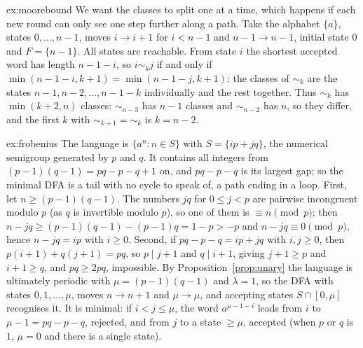 \begin{solution}{ex:moorebound}
\idea We want the classes to split one at a time, which happens if each new round can only see one step further along a path.
\writeup Take the alphabet $\{a\}$, states $0,\dots,n-1$, moves $i\to i+1$ for $i<n-1$ and $n-1\to n-1$, initial state $0$ and $F=\{n-1\}$. All states are reachable. From state $i$ the shortest accepted word has length $n-1-i$, so $i\sim_kj$ if and only if $\min(n-1-i,k+1)=\min(n-1-j,k+1)$: the classes of $\sim_k$ are the states $n-1,n-2,\dots,n-1-k$ individually and the rest together. Thus $\sim_k$ has $\min(k+2,n)$ classes: $\sim_{n-3}$ has $n-1$ classes and $\sim_{n-2}$ has $n$, so they differ, and the first $k$ with $\sim_{k+1}=\sim_k$ is $k=n-2$.
\end{solution}

\begin{solution}{ex:frobenius}
\idea The language is $\{a^n:n\in S\}$ with $S=\{ip+jq\}$, the numerical semigroup generated by $p$ and $q$. It contains all integers from $(p-1)(q-1)=pq-p-q+1$ on, and $pq-p-q$ is its largest gap; so the minimal DFA is a tail with no cycle to speak of, a path ending in a loop.
\writeup First, let $n\ge(p-1)(q-1)$. The numbers $jq$ for $0\le j<p$ are pairwise incongruent modulo $p$ (as $q$ is invertible modulo $p$), so one of them is $\equiv n\pmod p$; then $n-jq\ge(p-1)(q-1)-(p-1)q=1-p>-p$ and $n-jq\equiv0\pmod p$, hence $n-jq=ip$ with $i\ge0$. Second, if $pq-p-q=ip+jq$ with $i,j\ge0$, then $p(i+1)+q(j+1)=pq$, so $p\mid j+1$ and $q\mid i+1$, giving $j+1\ge p$ and $i+1\ge q$, and $pq\ge2pq$, impossible.
By Proposition~\ref{prop:unary} the language is ultimately periodic with $\mu=(p-1)(q-1)$ and $\lambda=1$, so the DFA with states $0,1,\dots,\mu$, moves $n\to n+1$ and $\mu\to\mu$, and accepting states $S\cap[0,\mu]$ recognises it. It is minimal: if $i<j\le\mu$, the word $a^{\mu-1-i}$ leads from $i$ to $\mu-1=pq-p-q$, rejected, and from $j$ to a state $\ge\mu$, accepted (when $p$ or $q$ is $1$, $\mu=0$ and there is a single state).
\end{solution}

